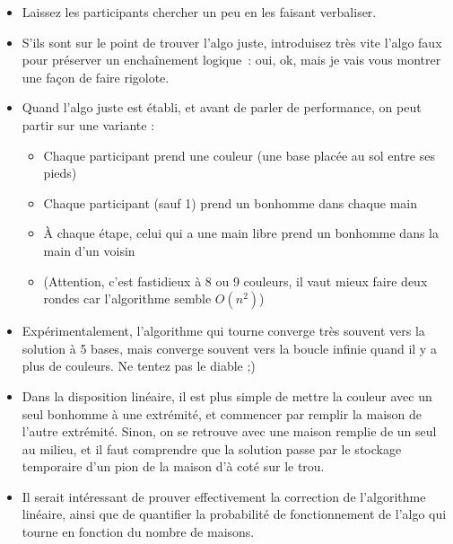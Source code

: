 \documentclass[a5paper,pagesize,DIV=14]{scrbook}
\begin{document}
\begin{itemize}
\item Laissez les participants chercher un peu en les faisant verbaliser.
\item S'ils sont sur le point de trouver l'algo juste, introduisez très vite
  l'algo faux pour préserver un enchaînement logique~: \og oui, ok, mais je vais
  vous montrer une façon de faire rigolote. \fg
\item Quand l'algo juste est établi, et avant de parler de performance, on peut
  partir sur une variante :
  \begin{itemize}
  \item Chaque participant prend une couleur (une base placée au sol entre ses
    pieds)
  \item Chaque participant (sauf 1) prend un bonhomme dans chaque main
  \item À chaque étape, celui qui a une main libre prend un bonhomme dans la
    main d'un voisin
  \item (Attention, c'est fastidieux à 8 ou 9 couleurs, il vaut mieux faire deux
    rondes car l'algorithme semble $O(n^2)$)
  \end{itemize}
\item Expérimentalement, l'algorithme qui tourne converge très souvent vers la
  solution à 5 bases, mais converge souvent vers la boucle infinie quand il y a
  plus de couleurs. Ne tentez pas le diable ;)
\item Dans la disposition linéaire, il est plus simple de mettre la couleur avec
  un seul bonhomme à une extrémité, et commencer par remplir la maison de
  l'autre extrémité. Sinon, on se retrouve avec une maison remplie de un seul au
  milieu, et il faut comprendre que la solution passe par le stockage temporaire
  d'un pion de la maison d'à coté sur le trou.
\item Il serait intéressant de prouver effectivement la correction de
  l'algorithme linéaire, ainsi que de quantifier la probabilité de
  fonctionnement de l'algo qui tourne en fonction du nombre de maisons.
\end{itemize}
\end{document}
